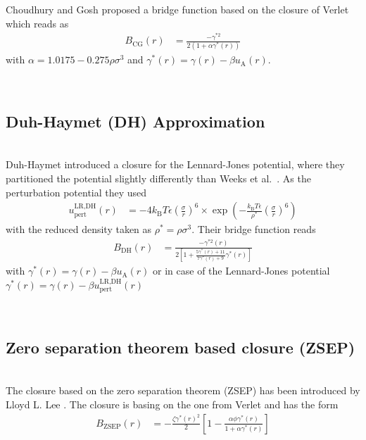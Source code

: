 Choudhury and Gosh \cite{Choudhury2002} proposed a bridge function based on the closure of Verlet
which reads as
\begin{align}
B_\text{CG}(r) &=
\frac{-\gamma^{*2}}{2\left(1+\alpha\gamma^*(r)\right)}
\end{align}
with $\alpha=1.0175-0.275\rho\sigma^3$ and $\gamma^*(r)=\gamma(r)-\beta u_\text{A}(r)$.

~\\
\subsection{Duh-Haymet (DH) Approximation }
~\\

Duh-Haymet \cite{Duh1995} introduced a closure for the Lennard-Jones potential,
where they partitioned the potential slightly differently than Weeks et al.\ \cite{Weeks1971}.
As the perturbation potential they used
\begin{align}
u^\text{LR,DH}_\text{pert}(r) &= -4k_\text{B}T\epsilon\left(\frac{\sigma}{r}\right)^6
\times \exp \left( -\frac{k_\text{B}T\epsilon}{\rho^*} \left(\frac{\sigma}{r}\right)^6 \right)
\end{align}
with the reduced density taken as $\rho^*=\rho\sigma^3$. Their bridge function reads
\begin{align}
B_\text{DH}(r) &=
\frac{-\gamma^{*2}(r)}{2\left[1+\frac{5\gamma^*(r)+11}{7\gamma^*(r)+9}\gamma^*(r)\right]}
\end{align}
with $\gamma^*(r) = \gamma(r) - \beta u_\text{A}(r)$ or in case of the Lennard-Jones potential
$\gamma^*(r) = \gamma(r) - \beta u^\text{LR,DH}_\text{pert}(r)$

\vphantom{.}~\\
\subsection{Zero separation theorem based closure (ZSEP)}
~\\

The closure based on the zero separation theorem (ZSEP) has been introduced by
Lloyd L. Lee \cite{Lee1995,Lomba1996}. The closure is basing on the one from Verlet \cite{Verlet1980}
and has the form
\begin{align}
B_\text{ZSEP}(r) &= - \frac{\zeta \gamma^*(r)^2}{2}\left[ 1- \frac{\alpha\phi\gamma^*(r)}{1+\alpha\gamma^*(r)}\right]
\end{align}


\vphantom{.}~\\
